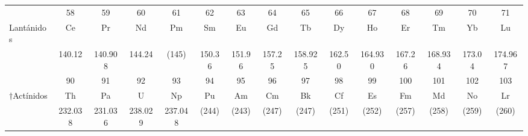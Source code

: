 \documentclass[10pt,landscape]{article}
\begin{document}
\begin{tabular}{|p{3.5cm}|*{14}{c|}}
    \hline
                           & \small 58      & \small 59      & \small 60      & \small 61      & \small 62     & \small 63     & \small 64     & \small 65      & \small 66     & \small 67      & \small 68     & \small 69      & \small 70     & \small 71      \\[-1mm]
    \sc *Lantánidos        & Ce             & Pr             & Nd             & Pm             & Sm            & Eu            & Gd            & Tb             & Dy            & Ho             & Er            & Tm             & Yb            & Lu             \\[-2mm]
                           & \small 140.12  & \small 140.908 & \small 144.24  & \small (145)   & \small 150.36 & \small 151.96 & \small 157.25 & \small 158.925 & \small 162.50 & \small 164.930 & \small 167.26 & \small 168.934 & \small 173.04 & \small 174.967 \\[-1mm]
    \hline
                           & \small 90      & \small 91      & \small 92      & \small 93      & \small 94     & \small 95     & \small 96     & \small 97      & \small 98     & \small 99      & \small 100    & \small 101     & \small 102    & \small 103     \\[-1mm]
    \sc $\dagger$Actínidos & Th             & Pa             & U              & Np             & Pu            & Am            & Cm            & Bk             & Cf            & Es             & Fm            & Md             & No            & Lr             \\[-2mm]
                           & \small 232.038 & \small 231.036 & \small 238.029 & \small 237.048 & \small (244)  & \small (243)  & \small (247)  & \small (247)   & \small (251)  & \small (252)   & \small (257)  & \small (258)   & \small (259)  & \small (260)   \\
    \hline
\end{tabular}
\end{document}
